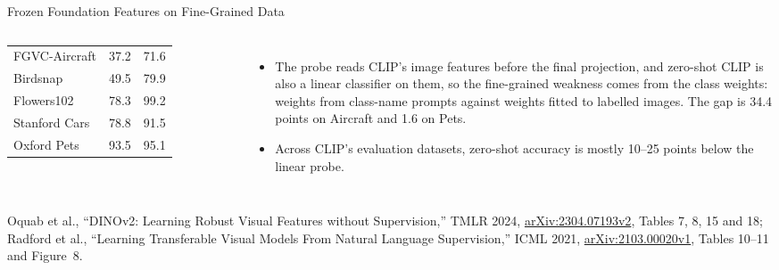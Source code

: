 \begin{frame}{Frozen Foundation Features on Fine-Grained Data}
\begin{columns}[T,onlytextwidth]
{\begin{tabular}{l r r}
        \midrule
        FGVC-Aircraft & 37.2 & 71.6 \\
        Birdsnap & 49.5 & 79.9 \\
        Flowers102 & 78.3 & 99.2 \\
        Stanford Cars & 78.8 & 91.5 \\
        Oxford Pets & 93.5 & 95.1 \\
        \bottomrule
      \end{tabular}\par}
      \vspace{0.3em}
      \begin{itemize}\scriptsize\itemsep0.25em
        \item The probe reads CLIP's image features before the final projection, and zero-shot CLIP is also a linear classifier on them, so the fine-grained weakness comes from the class weights: weights from class-name prompts against weights fitted to labelled images. The gap is 34.4 points on Aircraft and 1.6 on Pets.
        \item Across CLIP's evaluation datasets, zero-shot accuracy is mostly 10--25 points below the linear probe.
      \end{itemize}
  \end{columns}
  \vspace{0.1em}
  {\scriptsize Oquab et al., ``DINOv2: Learning Robust Visual Features without Supervision,'' TMLR 2024, \href{https://arxiv.org/abs/2304.07193v2}{arXiv:2304.07193v2}, Tables 7, 8, 15 and 18; Radford et al., ``Learning Transferable Visual Models From Natural Language Supervision,'' ICML 2021, \href{https://arxiv.org/abs/2103.00020v1}{arXiv:2103.00020v1}, Tables 10--11 and Figure~8.\par}
\end{frame}

